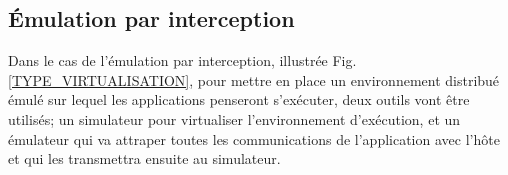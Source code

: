 \subsection{Émulation par interception}
\label{section:interception}

Dans le cas de l'émulation par interception, illustrée
Fig.\ref{TYPE_VIRTUALISATION}, pour mettre en place un environnement distribué
émulé sur lequel les applications penseront s'exécuter, deux outils vont être
utilisés; un simulateur pour virtualiser l'environnement d'exécution, et un
émulateur qui va attraper toutes les communications de l'application avec l'hôte
et qui les transmettra ensuite au simulateur.

